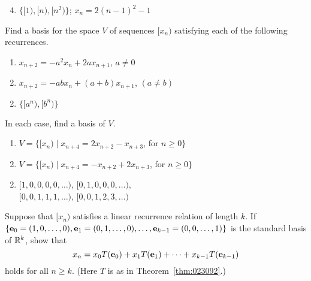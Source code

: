 \begin{multicols}{2}
\begin{ex}
\begin{sol}
\begin{enumerate}[label={\alph*.}]
\setcounter{enumi}{3}
\item $\{[1), [n), [n^2)\}$; $x_n = 2(n - 1)^2 - 1$

\end{enumerate}
\end{sol}
\end{ex}

\begin{ex}
Find a basis for the space $V$ of sequences $[x_{n})$ satisfying each of the following recurrences.


\begin{enumerate}[label={\alph*.}]
\item $x_{n+2} = -a^{2}x_{n} + 2ax_{n+1}$, $a \neq 0$

\item $x_{n+2} = -abx_{n} + (a + b)x_{n+1}$, $(a \neq b)$

\end{enumerate}
\begin{sol}
\begin{enumerate}[label={\alph*.}]
\setcounter{enumi}{1}
\item $\{[a^{n}), [b^{n})\}$

\end{enumerate}
\end{sol}
\end{ex}

\begin{ex}
In each case, find a basis of $V$.


\begin{enumerate}[label={\alph*.}]
\item $V = \{[x_{n}) \mid x_{n+4} = 2x_{n+2} - x_{n+3}$, for $n \geq 0\}$

\item $V = \{[x_{n}) \mid x_{n+4} = -x_{n+2} + 2x_{n+3}$, for $n \geq 0\}$

\end{enumerate}
\begin{sol}
\begin{enumerate}[label={\alph*.}]
\setcounter{enumi}{1}
\item  $[1, 0, 0, 0, 0, \dots)$, $[0, 1, 0, 0, 0, \dots)$, \\ $[0, 0, 1, 1, 1, \dots)$, $[0, 0, 1, 2, 3, \dots)$

\end{enumerate}
\end{sol}
\end{ex}

\begin{ex}
Suppose that $[x_{n})$ satisfies a linear recurrence relation of length $k$. If $\{\textbf{e}_{0} = (1, 0, \dots, 0), \\ \textbf{e}_{1} = (0, 1, \dots, 0), \dots, \textbf{e}_{k-1} = (0, 0, \dots, 1)\}$ is the standard basis of $\mathbb{R}^k$, show that 
\begin{equation*}
x_{n} = x_{0}T(\textbf{e}_{0}) + x_{1}T(\textbf{e}_{1}) + \cdots + x_{k-1}T(\textbf{e}_{k-1})
\end{equation*}
 holds for all $n \geq k$. (Here $T$ is as in Theorem~\ref{thm:023092}.)
\end{ex}


\end{multicols}
